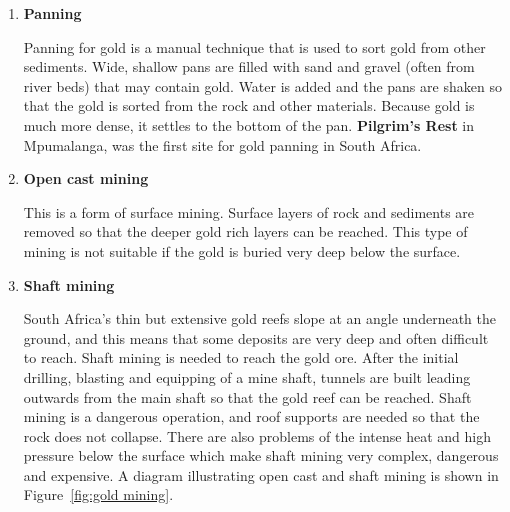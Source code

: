 \begin{enumerate}

\item{\textbf{Panning}

Panning for gold is a manual technique that is used to sort gold from other sediments. Wide, shallow pans are filled with sand and gravel (often from river beds) that may contain gold. Water is added and the pans are shaken so that the gold is sorted from the rock and other materials. Because gold is much more dense, it settles to the bottom of the pan. \textbf{Pilgrim's Rest} in Mpumalanga, was the first site for gold panning in South Africa.
}

\item{\textbf{Open cast mining}

This is a form of surface mining. Surface layers of rock and sediments are removed so that the deeper gold rich layers can be reached. This type of mining is not suitable if the gold is buried very deep below the surface.
}
\pagebreak
\item{\textbf{Shaft mining}

South Africa's thin but extensive gold reefs slope at an angle underneath the ground, and this means that some deposits are very deep and often difficult to reach.  Shaft mining is needed to reach the gold ore. After the initial drilling, blasting and equipping of a mine shaft, tunnels are built leading outwards from the main shaft so that the gold reef can be reached. Shaft mining is a dangerous operation, and roof supports are needed so that the rock does not collapse. There are also problems of the intense heat and high pressure below the surface which make shaft mining very complex, dangerous and expensive. A diagram illustrating open cast and shaft mining is shown in Figure~\ref{fig:gold mining}.
}


\end{enumerate}
